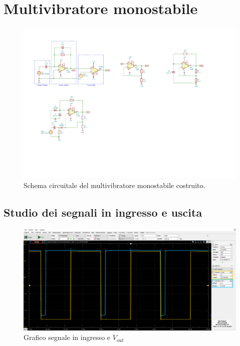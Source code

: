 \documentclass[10pt,a4paper]{article}
\begin{document}
\section{Multivibratore monostabile}
\begin{figure}[htbp]
    \centering
	\includegraphics[scale=1.2]{monostable}
    \caption{Schema circuitale del multivibratore monostabile costruito.
    \label{fig: monostableschm}}
\end{figure}

\subsection{Studio dei segnali in ingresso e uscita}
\begin{figure}[htbp]
\centering
\includegraphics[scale=0.42]{monostabile}
\caption{Grafico segnale in ingresso e $V_{out}$ \label{fig: vout_mstabile}}
\end{figure}
\end{document}
